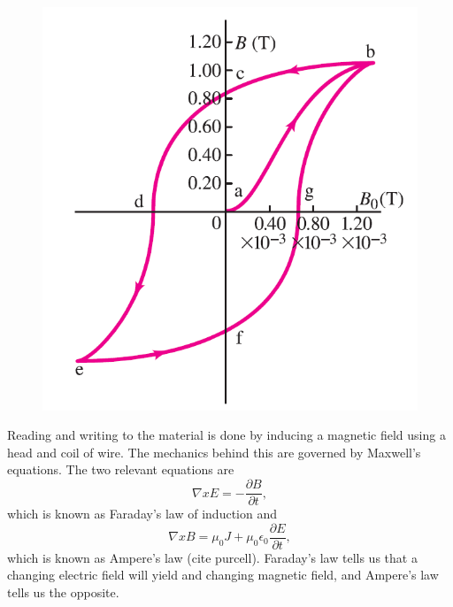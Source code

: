 \documentclass[ aip, 12pt]{revtex4-1} %
\begin{document}
\begin{figure}[H]
\centerline{\includegraphics[scale=.45]{hysteresis.png}}
\caption{ }
\label{hysteresis}
\end{figure}

Reading and writing to the material is done by inducing a magnetic field using a head and coil of wire. The mechanics behind this are governed by Maxwell's equations. The two relevant equations are
\begin{equation}
\nabla x E = -\frac{\partial B}{\partial t},
\label{faraday}
\end{equation}
which is known as Faraday's law of induction and 
\begin{equation}
\nabla x B = \mu_0 J +\mu_0\epsilon_0\frac{\partial E}{\partial t},
\label{ampere}
\end{equation}
which is known as Ampere's law (cite purcell). Faraday's law tells us that a changing electric field will yield and changing magnetic field, and Ampere's law tells us the opposite. 
\end{document}
